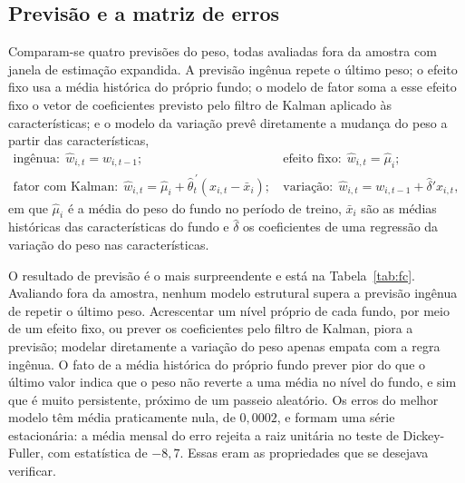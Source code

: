 \documentclass[12pt,a4paper]{article}
\begin{document}
\subsection{Previsão e a matriz de erros}

Comparam-se quatro previsões do peso, todas avaliadas fora da amostra com janela de estimação
expandida. A previsão ingênua repete o último peso; o efeito fixo usa a média histórica do próprio
fundo; o modelo de fator soma a esse efeito fixo o vetor de coeficientes previsto pelo filtro de
Kalman aplicado às características; e o modelo da variação prevê diretamente a mudança do peso a
partir das características,
\begin{align*}
\text{ingênua:}\ \ \widehat{w}_{i,t}=w_{i,t-1};
&\qquad
\text{efeito fixo:}\ \ \widehat{w}_{i,t}=\widehat{\mu}_i;\\
\text{fator com Kalman:}\ \ \widehat{w}_{i,t}=\widehat{\mu}_i+\widehat{\theta}_t^{\,\prime}(x_{i,t}-\bar{x}_i);
&\qquad
\text{variação:}\ \ \widehat{w}_{i,t}=w_{i,t-1}+\widehat{\delta}'x_{i,t},
\end{align*}
em que $\widehat{\mu}_i$ é a média do peso do fundo no período de treino, $\bar{x}_i$ são as médias
históricas das características do fundo e $\widehat{\delta}$ os coeficientes de uma regressão da
variação do peso nas características.

O resultado de previsão é o mais surpreendente e está na Tabela~\ref{tab:fc}. Avaliando fora
da amostra, nenhum modelo estrutural supera a previsão ingênua de repetir o último peso.
Acrescentar um nível próprio de cada fundo, por meio de um efeito fixo, ou prever os
coeficientes pelo filtro de Kalman, piora a previsão; modelar diretamente a variação do peso
apenas empata com a regra ingênua. O fato de a média histórica do próprio fundo prever pior
do que o último valor indica que o peso não reverte a uma média no nível do fundo, e sim que é
muito persistente, próximo de um passeio aleatório. Os erros do melhor modelo têm média
praticamente nula, de $0{,}0002$, e formam uma série estacionária: a média mensal do erro rejeita a
raiz unitária no teste de Dickey-Fuller, com estatística de $-8{,}7$. Essas eram as propriedades que
se desejava verificar.
\end{document}
